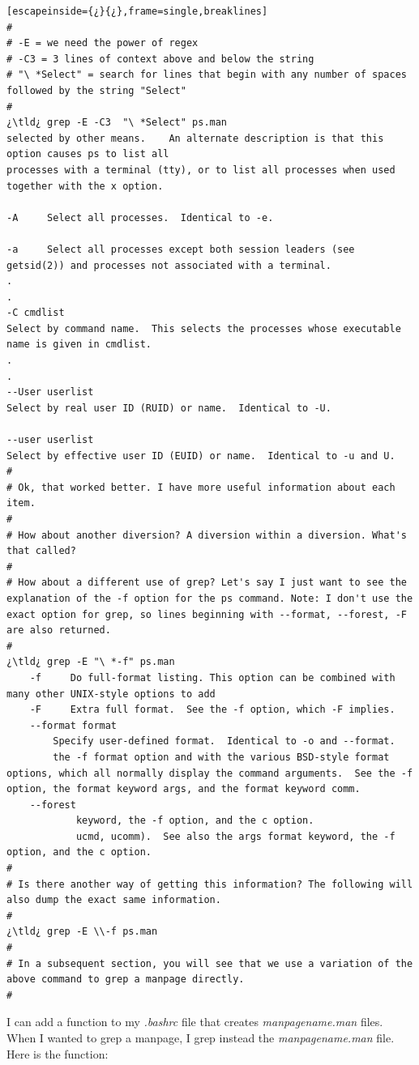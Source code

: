 \begin{lstlisting}[escapeinside={¿}{¿},frame=single,breaklines]
#
# -E = we need the power of regex
# -C3 = 3 lines of context above and below the string
# "\ *Select" = search for lines that begin with any number of spaces followed by the string "Select"
#
¿\tld¿ grep -E -C3  "\ *Select" ps.man
selected by other means.	An alternate description is that this option causes ps to list all
processes with a terminal (tty), or to list all processes when used together with the x option.

-A     Select all processes.  Identical to -e.

-a     Select all processes except both session leaders (see getsid(2)) and processes not associated with a terminal.
.
.
-C cmdlist
Select by command name.  This selects the processes whose executable name is given in cmdlist.
.
.
--User userlist
Select by real user ID (RUID) or name.  Identical to -U.

--user userlist
Select by effective user ID (EUID) or name.  Identical to -u and U.
#
# Ok, that worked better. I have more useful information about each item.
#
# How about another diversion? A diversion within a diversion. What's that called? 
#
# How about a different use of grep? Let's say I just want to see the explanation of the -f option for the ps command. Note: I don't use the exact option for grep, so lines beginning with --format, --forest, -F are also returned.
#
¿\tld¿ grep -E "\ *-f" ps.man
	-f     Do full-format listing. This option can be combined with many other UNIX-style options to add
	-F     Extra full format.  See the -f option, which -F implies.
	--format format
		Specify user-defined format.  Identical to -o and --format.
		the -f format option and with the various BSD-style format options, which all normally display the command arguments.  See the -f option, the format keyword args, and the format keyword comm.
	--forest
			keyword, the -f option, and the c option.
			ucmd, ucomm).  See also the args format keyword, the -f option, and the c option.
#
# Is there another way of getting this information? The following will also dump the exact same information.
#
¿\tld¿ grep -E \\-f ps.man
#
# In a subsequent section, you will see that we use a variation of the above command to grep a manpage directly.
#
\end{lstlisting}

I can add a function to my \textsl{.bashrc} file that creates \textsl{manpagename.man} files. When I wanted to grep a manpage, I grep instead the \textsl{manpagename.man} file. Here is the function:

